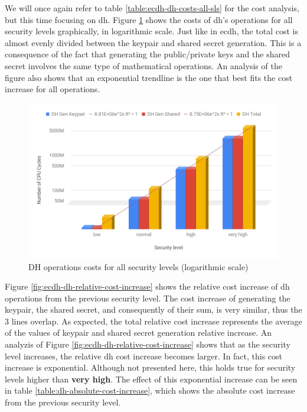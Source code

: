 We will once again refer to table \ref{table:ecdh-dh-costs-all-sls} for the cost analysis, but this time focusing on \gls{dh}. Figure
\ref{fig:dh-costs-all-sls} shows the costs of \gls{dh}'s operations for all security levels graphically, in logarithmic scale. Just like in \gls{ecdh}, the total cost
is almost evenly divided between the keypair and shared secret generation. This is a consequence of the fact that generating the public/private keys
and the shared secret involves the same type of mathematical operations. An analysis of the figure
also shows that an exponential trendline is the one that best fits the cost increase for all operations.

  \begin{figure}
    \centering
    \includegraphics[width=1.0\textwidth]{img/dh_costs_all_sls.png}
    \centering \caption{\label{fig:dh-costs-all-sls} DH operations costs for all security levels (logarithmic scale)}
  \end{figure}

Figure \ref{fig:ecdh-dh-relative-cost-increase} shows the relative cost increase of \gls{dh} operations from the previous security level.
The cost increase of generating the keypair, the shared secret, and consequently of their sum, is very similar, thus the $3$ lines overlap.
As expected, the total relative cost increase represents the average of the values of keypair and shared secret generation relative increase.
An analyzis of Figure \ref{fig:ecdh-dh-relative-cost-increase} shows that as the security level increases, the relative 
\gls{dh} cost increase becomes larger. In fact, this cost increase is exponential. Although not presented here, this holds true for 
security levels higher than \textbf{very high}. The effect of this exponential increase can be seen in table 
\ref{table:dh-absolute-cost-increase}, which shows the absolute cost increase from the previous security level.

